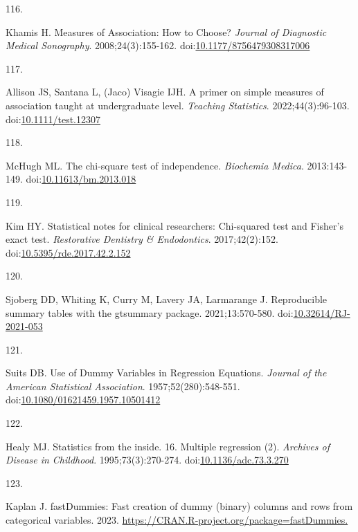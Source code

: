 \documentclass[
]{book}
\newlength{\cslhangindent}
\newlength{\csllabelwidth}
\newlength{\cslentryspacingunit} %
\newenvironment{CSLReferences}[2] %
 {%
  \setlength{\parindent}{0pt}
  \ifodd #1
  \let\oldpar\par
  \def\par{\hangindent=\cslhangindent\oldpar}
  \fi
  \setlength{\parskip}{#2\cslentryspacingunit}
 }%
 {}
\newcommand{\CSLLeftMargin}[1]{\parbox[t]{\csllabelwidth}{#1}}
\newcommand{\CSLRightInline}[1]{\parbox[t]{\linewidth - \csllabelwidth}{#1}\break}
\begin{document}
\begin{CSLReferences}{0}{0}
\leavevmode{}%
\CSLLeftMargin{116. }%
\CSLRightInline{Khamis H. Measures of Association: How to Choose? \emph{Journal of Diagnostic Medical Sonography}. 2008;24(3):155-162. doi:\href{https://doi.org/10.1177/8756479308317006}{10.1177/8756479308317006}}

\leavevmode{}%
\CSLLeftMargin{117. }%
\CSLRightInline{Allison JS, Santana L, (Jaco) Visagie IJH. A primer on simple measures of association taught at undergraduate level. \emph{Teaching Statistics}. 2022;44(3):96-103. doi:\href{https://doi.org/10.1111/test.12307}{10.1111/test.12307}}

\leavevmode{}%
\CSLLeftMargin{118. }%
\CSLRightInline{McHugh ML. The chi-square test of independence. \emph{Biochemia Medica}. 2013:143-149. doi:\href{https://doi.org/10.11613/bm.2013.018}{10.11613/bm.2013.018}}

\leavevmode{}%
\CSLLeftMargin{119. }%
\CSLRightInline{Kim HY. Statistical notes for clinical researchers: Chi-squared test and Fisher's exact test. \emph{Restorative Dentistry \& Endodontics}. 2017;42(2):152. doi:\href{https://doi.org/10.5395/rde.2017.42.2.152}{10.5395/rde.2017.42.2.152}}

\leavevmode{}%
\CSLLeftMargin{120. }%
\CSLRightInline{Sjoberg DD, Whiting K, Curry M, Lavery JA, Larmarange J. Reproducible summary tables with the gtsummary package. 2021;13:570-580. doi:\href{https://doi.org/10.32614/RJ-2021-053}{10.32614/RJ-2021-053}}

\leavevmode{}%
\CSLLeftMargin{121. }%
\CSLRightInline{Suits DB. Use of Dummy Variables in Regression Equations. \emph{Journal of the American Statistical Association}. 1957;52(280):548-551. doi:\href{https://doi.org/10.1080/01621459.1957.10501412}{10.1080/01621459.1957.10501412}}

\leavevmode{}%
\CSLLeftMargin{122. }%
\CSLRightInline{Healy MJ. Statistics from the inside. 16. Multiple regression (2). \emph{Archives of Disease in Childhood}. 1995;73(3):270-274. doi:\href{https://doi.org/10.1136/adc.73.3.270}{10.1136/adc.73.3.270}}

\leavevmode{}%
\CSLLeftMargin{123. }%
\CSLRightInline{Kaplan J. fastDummies: Fast creation of dummy (binary) columns and rows from categorical variables. 2023. \href{https://CRAN.R-project.org/package=fastDummies}{https://CRAN.R-project.org/package=fastDummies.}}


\end{CSLReferences}
\end{document}
